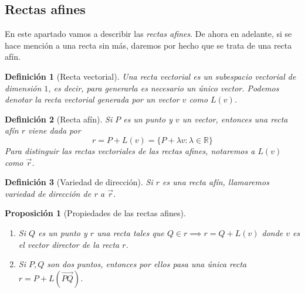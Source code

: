 \documentclass[11pt, a4paper]{article}
\newif\IfInSansMode
\newcommand{\R}{\mathbb{R}}
\renewcommand{\vec}{\overrightarrow}
\theoremstyle{theorem-style}
\newtheorem{nprop}{Proposición}[section]
\theoremstyle{definition-style}
\newtheorem{ndef}{Definición}[section]
\theoremstyle{remark-style}
\theoremstyle{example-style}
\newenvironment{nlist}
{\begin{enumerate}
    \renewcommand\labelenumi{(\emph{\roman{enumi})}}}
  {\end{enumerate}}
\begin{document}




\subsection{Rectas afines}

En este apartado vamos a describir las \textit{rectas afines}. De ahora en adelante, si se hace mención a una recta sin más, daremos por hecho que se trata de una recta afín.

\begin{ndef}[Recta vectorial]
  Una recta vectorial es un subespacio vectorial de dimensión $1$, es decir, para generarla es necesario un único vector. Podemos denotar la recta vectorial generada por un vector $v$ como $L(v)$.
\end{ndef}

\begin{ndef}[Recta afín]
  Si $P$ es un punto y $v$ un vector, entonces una recta afín $r$ viene dada por
  \[
    r = P+L(v) = \{P + \lambda v : \lambda \in \R\}
  \]
  Para distinguir las rectas vectoriales de las rectas afines, notaremos a $L(v)$ como $\vec{r}$.
\end{ndef}

\begin{ndef}[Variedad de dirección]
  Si $r$ es una \textit{recta afín}, llamaremos \textit{variedad de dirección de r} a $\vec{r}$.
\end{ndef}

\begin{nprop}[Propiedades de las rectas afines]\hfill
\begin{nlist}
\item Si $Q$ es un punto y $r$ una recta tales que $Q\in r \implies r = Q +L(v)$ donde $v$ es el vector director de la recta $r$.
\item Si $P,Q$ son dos puntos, entonces por ellos pasa una única recta $r = P +L(\overrightarrow{PQ})$. \\
 
\end{nlist}
\end{nprop}
\end{document}
